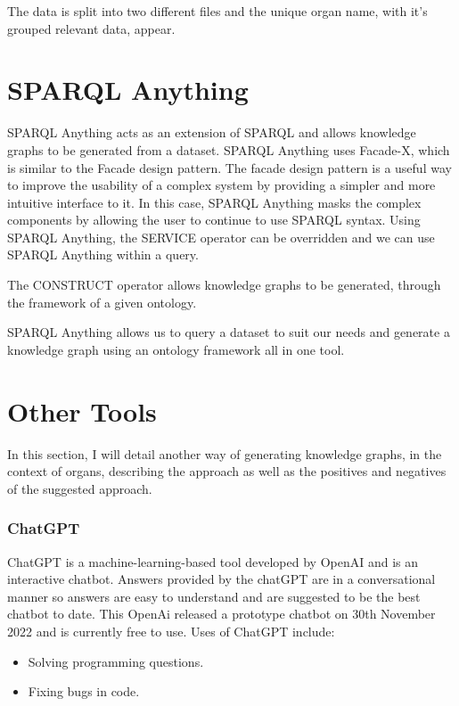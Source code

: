 The data is split into two different files and the unique organ name, with it's grouped relevant data, appear.  

\section{SPARQL Anything}
\hspace{0.5cm} SPARQL Anything acts as an extension of SPARQL and allows knowledge graphs to be generated from a dataset. SPARQL Anything uses Facade-X, which is similar to the Facade design pattern. The facade design pattern is a useful way to improve the usability of a complex system by providing a simpler and more intuitive interface to it. In this case, SPARQL Anything masks the complex components by allowing the user to continue to use SPARQL syntax. Using SPARQL Anything, the SERVICE operator can  be overridden and we can use SPARQL Anything within a query. \cite{sparqlanything}

The CONSTRUCT operator allows knowledge graphs to be generated, through the framework of a given ontology. \cite{sparqlanythinggithub}

SPARQL Anything allows us to query a dataset to suit our needs and generate a knowledge graph using an ontology framework all in one tool. \cite{sparqlanythinggithub}

\section{Other Tools}

\hspace{0.5cm} In this section, I will detail another way of generating knowledge graphs, in the context of organs, describing the approach as well as the positives and negatives of the suggested approach.

\subsubsection{ChatGPT}
\hspace{0.5cm}  ChatGPT is a machine-learning-based tool developed by OpenAI and is an interactive chatbot. Answers provided by the chatGPT are in a conversational manner so answers are easy to understand and are suggested to be the best chatbot to date. \cite{chatgpt} This OpenAi released a prototype chatbot on 30th November 2022 and is currently free to use. Uses of ChatGPT include:
\begin{itemize}
\item Solving programming questions.
\item Fixing bugs in code.
\end{itemize}

